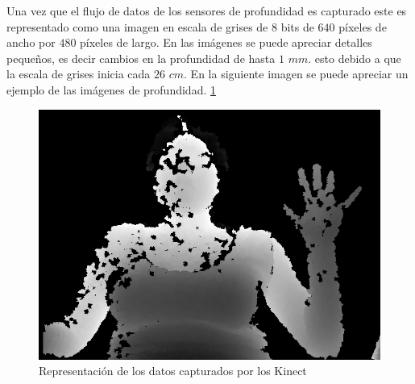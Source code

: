 Una vez que el flujo de datos de los sensores de profundidad es capturado este es representado como una imagen en escala de grises de $8$ bits de $640$ p\'ixeles de ancho por $480$ p\'ixeles de largo. En las imágenes se puede apreciar detalles pequeños, es decir cambios en la profundidad de hasta $1$  $mm.$ esto debido a que la escala de grises inicia cada $26$  $cm$. 
En la siguiente imagen se puede apreciar un ejemplo de las imágenes de profundidad. \ref{fig:ImagenCapturada}

\begin{figure}[h!]
\begin{center}
\includegraphics[scale=.35]{./Figures/166.png}
\end{center}
\caption{Representación de los datos capturados por los Kinect}
\label{fig:ImagenCapturada}
\end{figure}  

